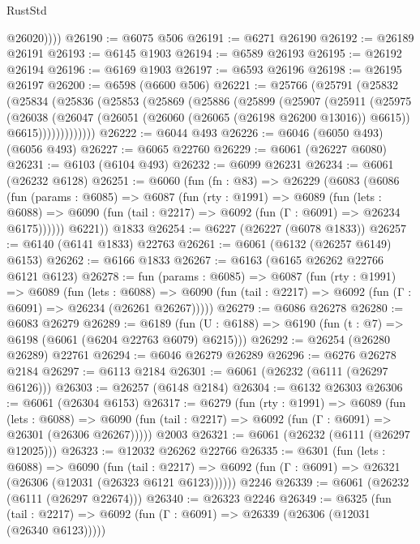 \begin{lexlean}{RustStd}
\begin{coremodule}
{\begin{coremodule}
{{{{{{{{{{{{{{{{{{{{{{{{{{            @26020))))
@26190 := @6075 @506
@26191 := @6271 @26190
@26192 := @26189 @26191
@26193 := @6145 @1903
@26194 := @6589 @26193
@26195 := @26192 @26194
@26196 := @6169 @1903
@26197 := @6593 @26196
@26198 := @26195 @26197
@26200 := @6598 (@6600 @506)
@26221 := @25766
    (@25791
      (@25832
        (@25834
          (@25836
            (@25853
              (@25869
                (@25886
                  (@25899
                    (@25907
                      (@25911
                        (@25975
                          (@26038
                            (@26047
                              (@26051 (@26060 (@26065 (@26198 @26200 @13016)) @6615))
                              @6615)))))))))))))
@26222 := @6044 @493
@26226 := @6046 (@6050 @493) (@6056 @493)
@26227 := @6065 @22760
@26229 := @6061 (@26227 @6080)
@26231 := @6103 (@6104 @493)
@26232 := @6099 @26231
@26234 := @6061 (@26232 @6128)
@26251 := @6060
    (fun (fn : @83) =>
    @26229
      (@6083
        (@6086
          (fun (params : @6085) =>
          @6087
            (fun (rty : @1991) =>
            @6089
              (fun (lets : @6088) =>
              @6090 (fun (tail : @2217) => @6092 (fun (Γ : @6091) => @26234 @6175))))))
        @6221))
    @1833
@26254 := @6227 (@26227 (@6078 @1833))
@26257 := @6140 (@6141 @1833) @22763
@26261 := @6061 (@6132 (@26257 @6149) @6153)
@26262 := @6166 @1833
@26267 := @6163 (@6165 @26262 @22766 @6121 @6123)
@26278 := fun (params : @6085) =>
  @6087
    (fun (rty : @1991) =>
    @6089
      (fun (lets : @6088) =>
      @6090 (fun (tail : @2217) => @6092 (fun (Γ : @6091) => @26234 (@26261 @26267)))))
@26279 := @6086 @26278
@26280 := @6083 @26279
@26289 := @6189
    (fun (U : @6188) => @6190 (fun (t : @7) => @6198 (@6061 (@6204 @22763 @6079) @6215)))
@26292 := @26254 (@26280 @26289) @22761
@26294 := @6046 @26279 @26289
@26296 := @6276 @26278 @2184
@26297 := @6113 @2184
@26301 := @6061 (@26232 (@6111 (@26297 @6126)))
@26303 := @26257 (@6148 @2184)
@26304 := @6132 @26303
@26306 := @6061 (@26304 @6153)
@26317 := @6279
    (fun (rty : @1991) =>
    @6089
      (fun (lets : @6088) =>
      @6090 (fun (tail : @2217) => @6092 (fun (Γ : @6091) => @26301 (@26306 @26267)))))
    @2003
@26321 := @6061 (@26232 (@6111 (@26297 @12025)))
@26323 := @12032 @26262 @22766
@26335 := @6301
    (fun (lets : @6088) =>
    @6090
      (fun (tail : @2217) =>
      @6092 (fun (Γ : @6091) => @26321 (@26306 (@12031 (@26323 @6121 @6123))))))
    @2246
@26339 := @6061 (@26232 (@6111 (@26297 @22674)))
@26340 := @26323 @2246
@26349 := @6325
    (fun (tail : @2217) => @6092 (fun (Γ : @6091) => @26339 (@26306 (@12031 (@26340 @6123)))))
}}}}}}}}}}}}}}}}}}}}}}}}}}
\end{coremodule}}
\end{coremodule}
\end{lexlean}
